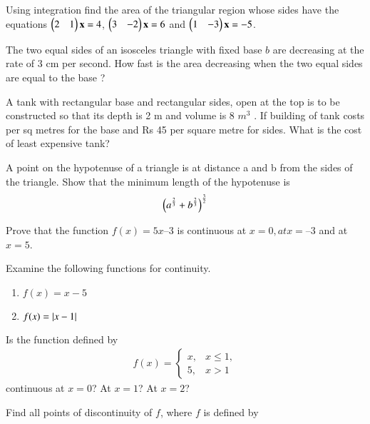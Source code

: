 \item  Using integration find the area of the triangular region whose sides have the equations $\begin{pmatrix}2 & 1 \end{pmatrix}\mathbf{x} = 4$, $\begin{pmatrix}3 & -2 \end{pmatrix}\mathbf{x} = 6$ and  $\begin{pmatrix}1 & -3 \end{pmatrix}\mathbf{x} = -5$.
\item The two equal sides of an isosceles triangle with fixed base $b$ are decreasing at the rate of 3 cm per second. How fast is the area decreasing when the two equal sides are equal to the base ?
\item A tank with rectangular base and rectangular sides, open at the top is to be constructed so that its depth is 2 m and volume is 8 $m^3$
. If building of tank costs
 per sq metres for the base and Rs 45 per square metre for sides. What is the cost of least expensive tank?
\item A point on the hypotenuse of a triangle is at distance a and b from the sides of the triangle.
Show that the minimum length of the hypotenuse is
%
\begin{align}
\left(a^{\frac{2}{3}}+b^{\frac{2}{3}}\right)^{\frac{3}{2}}
\end{align}
%
\item Prove that the function $f(x) = 5x – 3$ is continuous at $x = 0, at x = – 3$ and at $x = 5$.
\item Examine the following functions for continuity.
%
\begin{enumerate}
\item $f(x) = x-5$
\item $f(x) = \left\vert x-1\right\vert$
\end{enumerate}
%
\item Is the function defined by 
%
\begin{align}
f(x)=
\begin{cases}
x, & x \le 1,
\\
5, & x > 1
\end{cases}
\end{align}
%
continuous at $x = 0$? At $x = 1$? At $x = 2$?
\item Find all points of discontinuity of $f$, where $f$ is defined by
%
